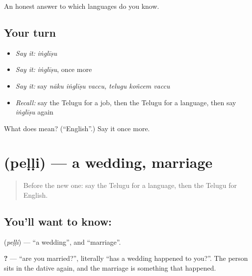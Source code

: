 \begin{grammarlens}[title={What you've built}]
An honest answer to which languages do you know.
\end{grammarlens}

\subsection*{Your turn}
\begin{itemize}
\raggedright
  \item \emph{Say it:} \emph{iṅglīṣu}
  \item \emph{Say it:} \emph{iṅglīṣu}, once more
  \item \emph{Say it:} say \emph{nāku iṅglīṣu vaccu, telugu koñcem vaccu}
  \item \emph{Recall:} say the Telugu for a job, then the Telugu for a language, then say \emph{iṅglīṣu} again
\end{itemize}

\begin{tcolorbox}[breakable,colback=teal!4,colframe=teal!35!black,title={Before you move on}]
What does  mean? (\textquotedblleft{}English\textquotedblright{}.) Say it once more.
\end{tcolorbox}
\section[\texorpdfstring{\te{పెళ్ళి} (peḷḷi)}{పెళ్ళి (peḷḷi)}]{ (peḷḷi) — a wedding, marriage}

\label{lesson:TE-C89-wedding}



\begin{quote}
Before the new one: say the Telugu for a language, then the Telugu for English.
\end{quote}

\subsection*{You'll want to know: }
\textbf{} (\emph{peḷḷi}) — \textquotedblleft{}a wedding\textquotedblright{}, and \textquotedblleft{}marriage\textquotedblright{}.

\textbf{  ?} — \textquotedblleft{}are you married?\textquotedblright{}, literally \textquotedblleft{}has a wedding happened to you?\textquotedblright{}. The person sits in the dative again, and the marriage is something that happened.

